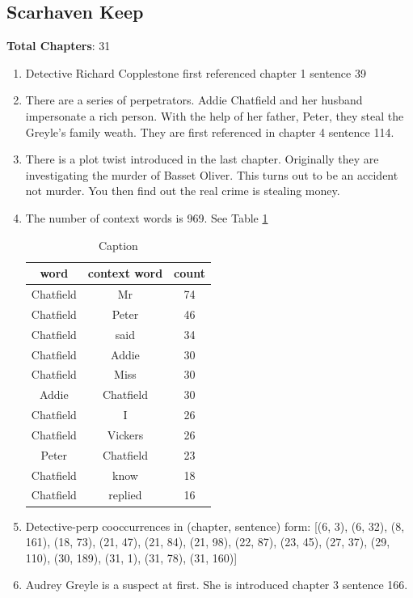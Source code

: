 \documentclass{article}
\begin{document}
\subsection{Scarhaven Keep}
\textbf{Total Chapters}: 31 \\
\begin{enumerate}
    \item Detective Richard Copplestone first referenced chapter 1 sentence 39 \\
    \item There are a series of perpetrators. Addie Chatfield and her husband impersonate a rich person. With the help of her father, Peter, they steal the Greyle's family weath. They are first referenced in chapter 4 sentence 114. \\
    \item There is a plot twist introduced in the last chapter. Originally they are investigating the murder of Basset Oliver. This turns out to be an accident not murder. You then find out the real crime is stealing money. \\
    \item The number of context words is 969. See Table \ref{tab:scar} \\
    \begin{table}[]
        \centering
        \begin{tabular}{c|c|c}
        word & context word & count \\ \hline
Chatfield & Mr & 74 \\
Chatfield & Peter & 46 \\
Chatfield & said & 34 \\
Chatfield & Addie & 30 \\
Chatfield & Miss & 30 \\
Addie & Chatfield & 30 \\
Chatfield & I & 26 \\
Chatfield & Vickers & 26 \\
Peter & Chatfield & 23 \\
Chatfield & know & 18 \\
Chatfield & replied & 16 \\
        \end{tabular}
        \caption{Caption}
        \label{tab:scar}
    \end{table}
    \item Detective-perp cooccurrences in (chapter, sentence) form: [(6, 3), (6, 32), (8, 161), (18, 73), (21, 47), (21, 84), (21, 98), (22, 87), (23, 45), (27, 37), (29, 110), (30, 189), (31, 1), (31, 78), (31, 160)] \\
    \item Audrey Greyle is a suspect at first. She is introduced chapter 3 sentence 166. \\
\end{enumerate}
\end{document}

